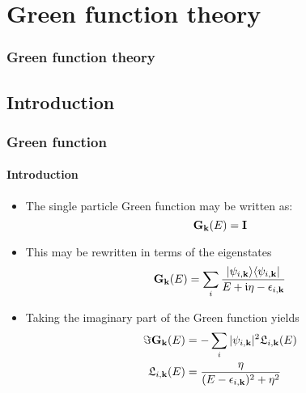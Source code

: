 \section{Green function theory}

\begin{framenologo}
  \frametitle{Green function theory}
  \tableofcontents[currentsection]
\end{framenologo}

\subsection{Introduction}

\begin{frame}
  \frametitle{Green function}
  \framesubtitle{Introduction}

  \begin{itemize}[<+->]
    \item %
    The single particle Green function may be written as:
    \begin{equation*}
      [(E+\im\eta)\ID - \HH_\kk]\G_\kk(E) = \ID
    \end{equation*}
    
    \item%
    This may be rewritten in terms of the eigenstates
    \begin{equation*}
      \mathbf{G}_{\mathbf{k}}(E) = \sum_i \frac{|\psi_{i,\mathbf{k}}\rangle\langle \psi_{i,\mathbf{k}}|}{E+\mathfrak{i}\eta-\epsilon_{i,\mathbf{k}}}
    \end{equation*}

    \item%
    Taking the imaginary part of the Green function yields
    \begin{align*}
      \Im \mathbf{G}_{\mathbf{k}}(E) &= -\sum_i |\psi_{i,\mathbf{k}}|^2\mathfrak{L}_{i,\mathbf{k}}(E)
      \\
      \mathfrak{L}_{i,\mathbf{k}}(E) &= \frac{\eta}{(E-\epsilon_{i,\mathbf{k}})^2 + \eta^2}
    \end{align*}
    
  \end{itemize}

\end{frame}


